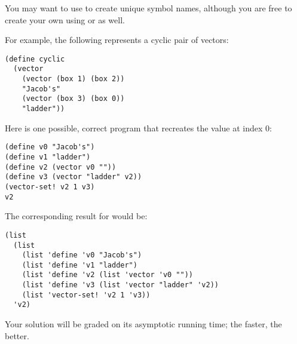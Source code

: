 \documentclass{article}
\begin{document}
You may want to use  to create unique symbol names, although you
are free to create your own using  or 
as well.

For example, the following  represents a cyclic pair of vectors:
\begin{verbatim}
(define cyclic
  (vector
    (vector (box 1) (box 2))
    "Jacob's"
    (vector (box 3) (box 0))
    "ladder"))
\end{verbatim}
Here is one possible, correct program that recreates the value at index 0:
\begin{verbatim}
(define v0 "Jacob's")
(define v1 "ladder")
(define v2 (vector v0 ""))
(define v3 (vector "ladder" v2))
(vector-set! v2 1 v3)
v2
\end{verbatim}
The corresponding result for  would be:
\begin{verbatim}
(list
  (list
    (list 'define 'v0 "Jacob's")
    (list 'define 'v1 "ladder")
    (list 'define 'v2 (list 'vector 'v0 ""))
    (list 'define 'v3 (list 'vector "ladder" 'v2))
    (list 'vector-set! 'v2 1 'v3))
  'v2)
\end{verbatim}

\medskip

Your solution will be graded on its asymptotic running time; the faster, the
better.
\end{document}
